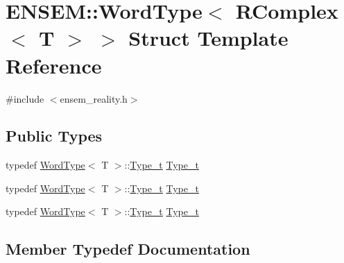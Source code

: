 \hypertarget{structENSEM_1_1WordType_3_01RComplex_3_01T_01_4_01_4}{}\section{E\+N\+S\+EM\+:\+:Word\+Type$<$ R\+Complex$<$ T $>$ $>$ Struct Template Reference}
\label{structENSEM_1_1WordType_3_01RComplex_3_01T_01_4_01_4}


{\ttfamily \#include $<$ensem\+\_\+reality.\+h$>$}

\subsection*{Public Types}
\begin{DoxyCompactItemize}
\item 
typedef \mbox{\hyperlink{structENSEM_1_1WordType}{Word\+Type}}$<$ T $>$\+::\mbox{\hyperlink{structENSEM_1_1WordType_3_01RComplex_3_01T_01_4_01_4_a24d907e746d8f478924d91103a7da3d5}{Type\+\_\+t}} \mbox{\hyperlink{structENSEM_1_1WordType_3_01RComplex_3_01T_01_4_01_4_a24d907e746d8f478924d91103a7da3d5}{Type\+\_\+t}}
\item 
typedef \mbox{\hyperlink{structENSEM_1_1WordType}{Word\+Type}}$<$ T $>$\+::\mbox{\hyperlink{structENSEM_1_1WordType_3_01RComplex_3_01T_01_4_01_4_a24d907e746d8f478924d91103a7da3d5}{Type\+\_\+t}} \mbox{\hyperlink{structENSEM_1_1WordType_3_01RComplex_3_01T_01_4_01_4_a24d907e746d8f478924d91103a7da3d5}{Type\+\_\+t}}
\item 
typedef \mbox{\hyperlink{structENSEM_1_1WordType}{Word\+Type}}$<$ T $>$\+::\mbox{\hyperlink{structENSEM_1_1WordType_3_01RComplex_3_01T_01_4_01_4_a24d907e746d8f478924d91103a7da3d5}{Type\+\_\+t}} \mbox{\hyperlink{structENSEM_1_1WordType_3_01RComplex_3_01T_01_4_01_4_a24d907e746d8f478924d91103a7da3d5}{Type\+\_\+t}}
\end{DoxyCompactItemize}


\subsection{Member Typedef Documentation}
\mbox{\label{structENSEM_1_1WordType_3_01RComplex_3_01T_01_4_01_4_a24d907e746d8f478924d91103a7da3d5}} 
